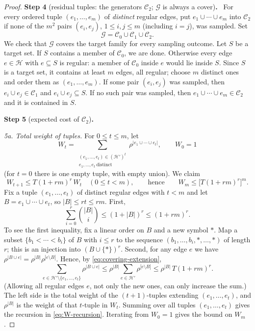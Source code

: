 \documentclass[11pt,letterpaper]{article}
\theoremstyle{definition}
\theoremstyle{remark}
\numberwithin{equation}{section}
\newcommand{\step}[2]{\medskip\noindent\textbf{Step #1} (#2)\textbf{.}\ }
\begin{document}
\begin{proof}
\step{4}{residual tuples: the generators $\mathcal C_2$; $\mathcal G$ is always a cover}
For every ordered tuple \((e_1,\ldots,e_m)\) of \emph{distinct} regular
edges, put \(e_1\cup\cdots\cup e_m\) into \(\mathcal C_2\) if none of the
$m^2$ pairs \((e_i,e_j)\), \(1\le i,j\le m\) (including $i=j$), was sampled.
Set
\[
\mathcal G=\mathcal C_0\cup\mathcal C_1\cup\mathcal C_2 .
\]
We check that $\mathcal G$ covers the target family for every sampling
outcome. Let $S$ be a target set. If $S$ contains a member of
$\mathcal C_0$, we are done. Otherwise every edge $e\in\mathcal H$ with
$e\subseteq S$ is regular: a member of $\mathcal C_0$ inside $e$ would lie
inside $S$. Since $S$ is a target set, it contains at least $m$ edges, all
regular; choose $m$ distinct ones and order them as $(e_1,\ldots,e_m)$. If
some pair $(e_i,e_j)$ was sampled, then $e_i\cup e_j\in\mathcal C_1$ and
$e_i\cup e_j\subseteq S$. If no such pair was sampled, then
$e_1\cup\cdots\cup e_m\in\mathcal C_2$ and it is contained in $S$.

\step{5}{expected cost of $\mathcal C_2$}

\emph{5a. Total weight of tuples.} For \(0\le t\le m\), let
\[
W_t=
\sum_{\substack{(e_1,\ldots,e_t)\in(\mathcal H')^t\\
                e_1,\ldots,e_t\ \text{distinct}}}
  \rho^{|e_1\cup\cdots\cup e_t|},
\qquad W_0=1
\]
(for $t=0$ there is one empty tuple, with empty union). We claim
\begin{equation}\label{eq:W-recursion}
W_{t+1}\le T(1+rm)^r\,W_t\quad(0\le t<m),
\qquad\text{hence}\qquad
W_m\le\bigl[T(1+rm)^r\bigr]^m .
\end{equation}
Fix a tuple $(e_1,\ldots,e_t)$ of distinct regular edges with $t<m$ and let
$B=e_1\cup\cdots\cup e_t$, so $|B|\le rt\le rm$. First,
\[
\sum_{i=0}^r\binom{|B|}{i}\le(1+|B|)^r\le(1+rm)^r .
\]
To see the first inequality, fix a linear order on $B$ and a new symbol
$\ast$. Map a subset $\{b_1<\cdots<b_i\}$ of $B$ with $i\le r$ to the
sequence $(b_1,\ldots,b_i,\ast,\ldots,\ast)$ of length $r$; this is an
injection into $(B\cup\{\ast\})^r$. Second, for any edge $e$ we have
\(\rho^{|B\cup e|}=\rho^{|B|}\rho^{|e\setminus B|}\). Hence, by
\eqref{eq:covering-extension},
\[
\sum_{e\in\mathcal H'\setminus\{e_1,\ldots,e_t\}}\rho^{|B\cup e|}
\le\rho^{|B|}\sum_{e\in\mathcal H'}\rho^{|e\setminus B|}
\le\rho^{|B|}\,T(1+rm)^r .
\]
(Allowing all regular edges $e$, not only the new ones, can only increase
the sum.) The left side is the total weight of the $(t+1)$-tuples
extending $(e_1,\ldots,e_t)$, and $\rho^{|B|}$ is the weight of that
$t$-tuple in $W_t$. Summing over all tuples $(e_1,\ldots,e_t)$ gives the
recursion in \eqref{eq:W-recursion}. Iterating from $W_0=1$ gives the
bound on $W_m$.


\end{proof}
\end{document}
